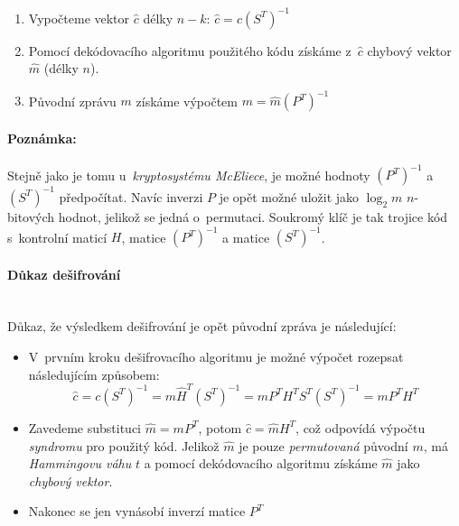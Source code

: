 \documentclass[thesis=M,czech,hidelinks]{FITthesis}[2012/06/26]
\newcommand{\0}{{\textcolor[gray]{0.75}{0}}}
\begin{document}
\begin{enumerate}
    \item Vypočteme vektor $\hat{c}$ délky $n-k$:
        $\hat{c} = c \left(S^T\right)^{-1} $
    \item Pomocí dekódovacího algoritmu použitého kódu získáme z~$\hat{c}$
        chybový vektor $\hat{m}$ (délky $n$).
    \item Původní zprávu $m$ získáme výpočtem
        $m = \hat{m} \left(P^T\right)^{-1}$
\end{enumerate}


\paragraph{Poznámka:} Stejně jako je tomu u~\emph{kryptosystému McEliece}, je
možné hodnoty $\left(P^T\right)^{-1}$ a $\left(S^T\right)^{-1}$ předpočítat.
Navíc inverzi $P$ je opět možné uložit jako $\log_2 m$ $n$-bitových hodnot,
jelikož se jedná o~permutaci. Soukromý klíč je tak trojice kód s~kontrolní
maticí $H$, matice $\left(P^T\right)^{-1}$ a matice $\left(S^T\right)^{-1}$.


\paragraph{Důkaz dešifrování} \hfill \\
Důkaz, že výsledkem dešifrování je opět původní zpráva je následující:

\begin{itemize}
    \item V~prvním kroku dešifrovacího algoritmu je možné výpočet rozepsat
        následujícím způsobem:
        $$
            \hat{c} =   c \left(S^T\right)^{-1} =
                        m \hat{H}^T \left(S^T\right)^{-1} =
                        m P^T H^T S^T \left(S^T\right)^{-1} =
                        m P^T H^T
        $$

    \item Zavedeme substituci $\hat{m} = m P^T$, potom $\hat{c} = \hat{m} H^T$,
        což odpovídá výpočtu \emph{syndromu} pro použitý kód. Jelikož $\hat{m}$
        je pouze \emph{permutovaná} původní $m$, má \emph{Hammingovu váhu} $t$
        a pomocí dekódovacího algoritmu získáme $\hat{m}$ jako \emph{chybový
        vektor}.

    \item Nakonec se jen vynásobí inverzí matice $P^T$

\end{itemize}
\end{document}

